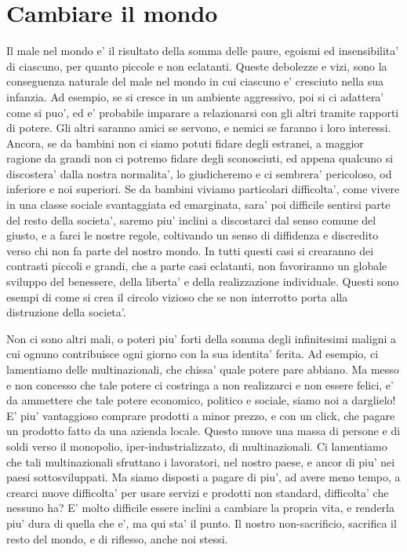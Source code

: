 \chapter{Cambiare il mondo}

Il male nel mondo e' il risultato della somma delle paure, egoismi ed insensibilita' di ciascuno, per quanto piccole e non eclatanti. Queste debolezze e vizi, sono la conseguenza naturale del male nel mondo in cui ciascuno e' cresciuto nella sua infanzia. Ad esempio, se si cresce in un ambiente aggressivo, poi si ci adattera' come si puo', ed e' probabile imparare a relazionarsi con gli altri tramite rapporti di potere. Gli altri saranno amici se servono, e nemici se faranno i loro interessi. Ancora, se da bambini non ci siamo potuti fidare degli estranei, a maggior ragione da grandi non ci potremo fidare degli sconosciuti, ed appena qualcuno si discostera' dalla nostra normalita', lo giudicheremo e ci sembrera' pericoloso, od inferiore e noi superiori. Se da bambini viviamo particolari difficolta', come vivere in una classe sociale svantaggiata ed emarginata, sara' poi difficile sentirsi parte del resto della societa', saremo piu' inclini a discostarci dal senso comune del giusto, e a farci le nostre regole, coltivando un senso di diffidenza e discredito verso chi non fa parte del nostro mondo. In tutti questi casi si crearanno dei contrasti piccoli e grandi, che a parte casi eclatanti, non favoriranno un globale sviluppo del benessere, della liberta' e della realizzazione individuale. Questi sono esempi di come si crea il circolo vizioso che se non interrotto porta alla distruzione della societa'.

Non ci sono altri mali, o poteri piu' forti della somma degli infinitesimi maligni a cui ognuno contribuisce ogni giorno con la sua identita' ferita. Ad esempio, ci lamentiamo delle multinazionali, che chissa' quale potere pare abbiano. Ma messo e non concesso che tale potere ci costringa a non realizzarci e non essere felici, e' da ammettere che tale potere economico, politico e sociale, siamo noi a darglielo! E' piu' vantaggioso comprare prodotti a minor prezzo, e con un click, che pagare un prodotto fatto da una azienda locale. Questo muove una massa di persone e di soldi verso il monopolio, iper-industrializzato, di multinazionali. Ci lamentiamo che tali multinazionali sfruttano i lavoratori, nel nostro paese, e ancor di piu' nei paesi sottosviluppati. Ma siamo disposti a pagare di piu', ad avere meno tempo, a crearci nuove difficolta' per usare servizi e prodotti non standard, difficolta' che nessuno ha? E' molto difficile essere inclini a cambiare la propria vita, e renderla piu' dura di quella che e', ma qui sta' il punto. Il nostro non-sacrificio, sacrifica il resto del mondo, e di riflesso, anche noi stessi.

